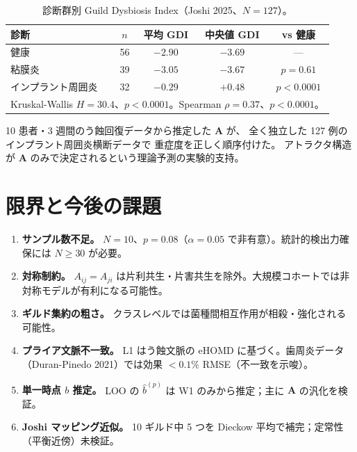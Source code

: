 \documentclass[10pt,a4paper]{article}
\newcommand{\bA}{\mathbf{A}}
\begin{document}
\begin{table}[H]
\centering\small
\caption{診断群別 Guild Dysbiosis Index（Joshi 2025、$N=127$）。}
\begin{tabular}{lcccc}
\toprule
診断 & $n$ & 平均 GDI & 中央値 GDI & vs 健康 \\
\midrule
健康                   & 56 & $-2.90$ & $-3.69$ & --- \\
粘膜炎                 & 39 & $-3.05$ & $-3.67$ & $p=0.61$ \\
インプラント周囲炎      & 32 & $-0.29$ & $+0.48$ & $p<0.0001$ \\
\bottomrule
\multicolumn{5}{l}{\small Kruskal-Wallis $H=30.4$、$p<0.0001$。Spearman $\rho=0.37$、$p<0.0001$。}
\end{tabular}
\end{table}

10 患者・3 週間のう蝕回復データから推定した $\bA$ が、
全く独立した 127 例のインプラント周囲炎横断データで
重症度を正しく順序付けた。
アトラクタ構造が $\bA$ のみで決定されるという理論予測の実験的支持。

\section{限界と今後の課題}

\begin{limitbox}[限界]
\begin{enumerate}[noitemsep]
  \item \textbf{サンプル数不足。} $N=10$、$p=0.08$（$\alpha=0.05$ で非有意）。統計的検出力確保には $N \geq 30$ が必要。
  \item \textbf{対称制約。} $A_{ij}=A_{ji}$ は片利共生・片害共生を除外。大規模コホートでは非対称モデルが有利になる可能性。
  \item \textbf{ギルド集約の粗さ。} クラスレベルでは菌種間相互作用が相殺・強化される可能性。
  \item \textbf{プライア文脈不一致。} L1 はう蝕文脈の eHOMD に基づく。歯周炎データ（Duran-Pinedo 2021）では効果 $< 0.1\%$ RMSE（不一致を示唆）。
  \item \textbf{単一時点 $b$ 推定。} LOO の $\hat b^{(p)}$ は W1 のみから推定；主に $\bA$ の汎化を検証。
  \item \textbf{Joshi マッピング近似。} 10 ギルド中 5 つを Dieckow 平均で補完；定常性（平衡近傍）未検証。
\end{enumerate}
\end{limitbox}
\end{document}
